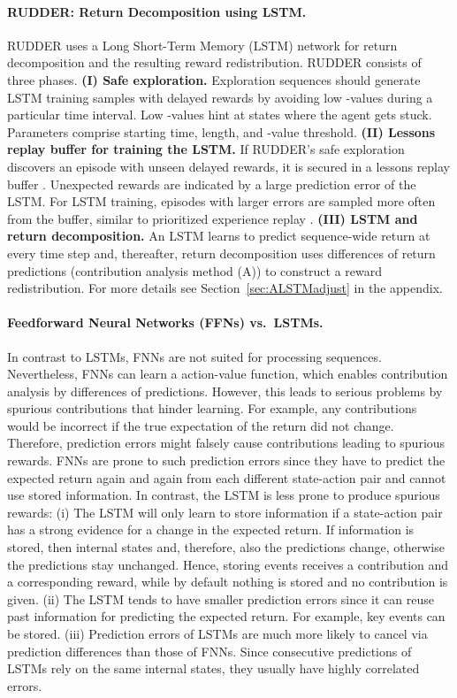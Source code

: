 \documentclass{article}
\begin{document}
\paragraph{RUDDER: Return Decomposition using LSTM.}
RUDDER uses a Long Short-Term Memory (LSTM) network for 
return decomposition and the resulting reward redistribution.
RUDDER consists of three phases. 
{\bf (I) Safe exploration.}
Exploration sequences should generate LSTM training samples 
with delayed rewards by avoiding 
low -values during a particular time interval. 
Low -values hint at states where the agent gets stuck. 
Parameters comprise starting time, length, and -value threshold.
{\bf (II) Lessons replay buffer for training the LSTM.}
If RUDDER's safe exploration discovers 
an episode with unseen delayed rewards,
it is secured in a lessons replay buffer \cite{Lin:93}. 
Unexpected rewards are indicated by a large prediction error of the LSTM.
For LSTM training, episodes with larger errors are sampled more often 
from the buffer, similar to prioritized
experience replay \cite{Schaul:15}.
{\bf (III) LSTM and return decomposition.}
An LSTM learns to predict sequence-wide return at 
every time step and, thereafter, 
return decomposition uses differences of return predictions
(contribution analysis method (A)) to construct a reward redistribution. 
For more details see Section~\ref{sec:ALSTMadjust} in the appendix.


\paragraph{Feedforward Neural Networks (FFNs) vs.\ LSTMs.}
In contrast to LSTMs, 
FNNs are not suited for processing sequences. 
Nevertheless, FNNs can learn a action-value function, which 
enables contribution analysis by 
differences of predictions. 
However, this leads to serious problems by spurious contributions
that hinder learning.
For example, any contributions would be incorrect
if the true expectation of the return did not change. 
Therefore, prediction errors might falsely cause contributions 
leading to spurious rewards. 
FNNs are prone to such prediction errors since they
have to predict the expected return
again and again from each different state-action pair and 
cannot use stored information.
In contrast, the LSTM is less prone to produce spurious 
rewards:
(i) The LSTM will only learn to store information 
if a state-action pair has a strong evidence 
for a change in the expected return. 
If information is stored, then internal states and,
therefore, also the predictions change, otherwise the predictions
stay unchanged.
Hence, storing events receives a contribution and
a corresponding reward, while by default nothing is stored and 
no contribution is given.
(ii) The LSTM tends to have smaller prediction errors since it can 
reuse past information for predicting the expected return. 
For example, key events can be stored.
(iii) Prediction errors of LSTMs are much more likely to cancel 
via prediction differences than those of FNNs. 
Since consecutive predictions of LSTMs rely on the same
internal states, they usually have highly correlated errors.
\end{document}
